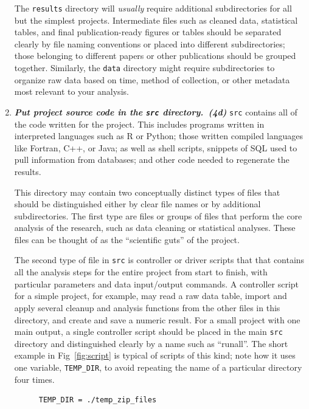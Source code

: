 \documentclass[10pt,letterpaper]{article}
\newcommand{\practice}[2]{\textbf{\emph{{#2}~({#1})}}}
\begin{document}
\begin{enumerate}
  The \texttt{results} directory will \emph{usually} require
  additional subdirectories for all but the simplest
  projects. Intermediate files such as cleaned data, statistical
  tables, and final publication-ready figures or tables should be
  separated clearly by file naming conventions or placed into
  different subdirectories; those belonging to different papers or
  other publications should be grouped together. Similarly, the
  \texttt{data} directory might require subdirectories to organize raw
  data based on time, method of collection, or other metadata most
  relevant to your analysis.

\item

  \practice{4d}{Put project source code in the \texttt{src}
  directory.}  \texttt{src} contains all of the code written for the
  project. This includes programs written in interpreted languages
  such as R or Python; those written compiled languages like Fortran,
  C++, or Java; as well as shell scripts, snippets of SQL used to pull
  information from databases; and other code needed to regenerate the
  results.

  This directory may contain two conceptually distinct types of files
  that should be distinguished either by clear file names or by
  additional subdirectories. The first type are files or groups of
  files that perform the core analysis of the research, such as data
  cleaning or statistical analyses.  These files can be thought of as
  the ``scientific guts'' of the project.

  The second type of file in \texttt{src} is controller or driver
  scripts that that contains all the analysis steps for the entire
  project from start to finish, with particular parameters and data
  input/output commands. A controller script for a simple project, for
  example, may read a raw data table, import and apply several cleanup
  and analysis functions from the other files in this directory, and
  create and save a numeric result. For a small project with one main
  output, a single controller script should be placed in the main
  \texttt{src} directory and distinguished clearly by a name such as
  ``runall''.  The short example in Fig~\ref{fig:script} is typical
  of scripts of this kind; note how it uses one variable,
  \texttt{TEMP\_DIR}, to avoid repeating the name of a particular
  directory four times.

\begin{figure}
{\small
\begin{verbatim}
TEMP_DIR = ./temp_zip_files


\end{verbatim}}
\end{figure}
\end{enumerate}
\end{document}
